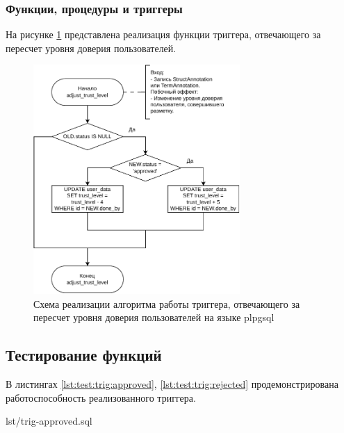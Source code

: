 \newpage

\subsubsection{Функции, процедуры и триггеры}

На рисунке \ref{fig:trig-impl} представлена реализация функции триггера, отвечающего за пересчет уровня доверия пользователей.

\begin{figure}[H]
	\centering
	\includegraphics[width=0.7\textwidth]{diag/tech-trig-v4.pdf}
	\caption{Схема реализации алгоритма работы триггера, отвечающего за пересчет уровня доверия пользователей на языке plpgsql}
	\label{fig:trig-impl}
\end{figure}

\subsection{Тестирование функций}


В листингах \ref{lst:test:trig:approved}, \ref{lst:test:trig:rejected} продемонстрирована работоспособность реализованного триггера.

\begin{code}
    \begin{lstinputlisting}[
            label={lst:test:trig:approved},
            caption={Увеличение уровня доверия пользователя при одобрении его разметки},
        ]{lst/trig-approved.sql}
    \end{lstinputlisting}
\end{code}

